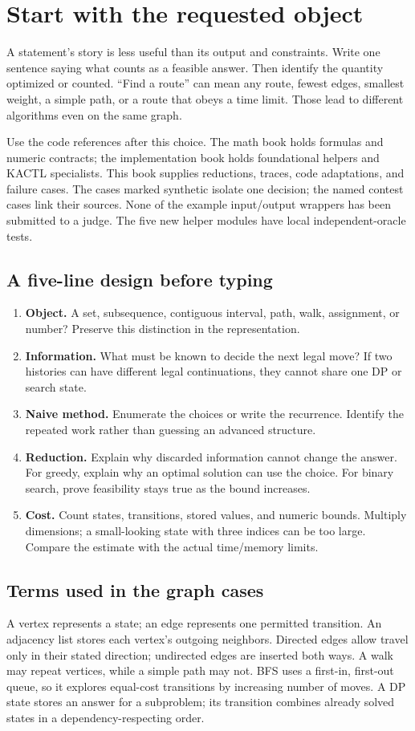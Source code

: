 \section{Start with the requested object}
A statement's story is less useful than its output and constraints. Write
one sentence saying what counts as a feasible answer. Then identify the
quantity optimized or counted. ``Find a route'' can mean any route, fewest
edges, smallest weight, a simple path, or a route that obeys a time limit.
Those lead to different algorithms even on the same graph.

Use the code references after this choice. The math book holds formulas and
numeric contracts; the implementation book holds foundational helpers and
KACTL specialists. This book supplies reductions, traces, code adaptations,
and failure cases. The cases marked synthetic isolate one decision; the
named contest cases link their sources. None of the example input/output
wrappers has been submitted to a judge. The five new helper modules have
local independent-oracle tests.

\subsection{A five-line design before typing}
\begin{enumerate}
\item \textbf{Object.} A set, subsequence, contiguous interval, path, walk,
assignment, or number? Preserve this distinction in the representation.
\item \textbf{Information.} What must be known to decide the next legal
move? If two histories can have different legal continuations, they cannot
share one DP or search state.
\item \textbf{Naive method.} Enumerate the choices or write the recurrence.
Identify the repeated work rather than guessing an advanced structure.
\item \textbf{Reduction.} Explain why discarded information cannot change
the answer. For greedy, explain why an optimal solution can use the choice.
For binary search, prove feasibility stays true as the bound increases.
\item \textbf{Cost.} Count states, transitions, stored values, and numeric
bounds. Multiply dimensions; a small-looking state with three indices can
be too large. Compare the estimate with the actual time/memory limits.
\end{enumerate}

\subsection{Terms used in the graph cases}
A vertex represents a state; an edge represents one permitted transition.
An adjacency list stores each vertex's outgoing neighbors. Directed edges
allow travel only in their stated direction; undirected edges are inserted
both ways. A walk may repeat vertices, while a simple path may not. BFS
uses a first-in, first-out queue, so it explores equal-cost transitions by
increasing number of moves. A DP state stores an answer for a subproblem;
its transition combines already solved states in a dependency-respecting order.

